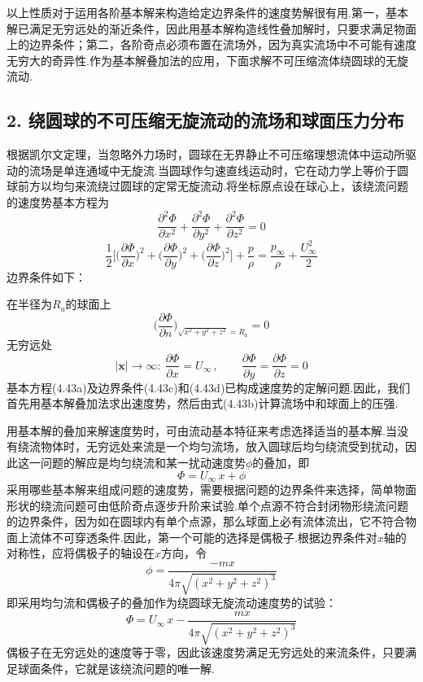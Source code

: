 以上性质对于运用各阶基本解来构造给定边界条件的速度势解很有用.第一，基本解已满足无穷远处的渐近条件，因此用基本解构造线性叠加解时，只要求满足物面上的边界条件；第二，各阶奇点必须布置在流场外，因为真实流场中不可能有速度无穷大的奇异性.作为基本解叠加法的应用，下面求解不可压缩流体绕圆球的无旋流动.

\subsection*{2. 绕圆球的不可压缩无旋流动的流场和球面压力分布}

根据凯尔文定理，当忽略外力场时，圆球在无界静止不可压缩理想流体中运动所驱动的流场是单连通域中无旋流.当圆球作匀速直线运动时，它在动力学上等价于圆球前方以均匀来流绕过圆球的定常无旋流动.将坐标原点设在球心上，该绕流问题的速度势基本方程为
\begin{equation*}
\frac{\partial^{2}\Phi}{\partial x^{2}}+\frac{\partial^{2}\Phi}{\partial y^{2}}+\frac{\partial^{2}\Phi}{\partial z^{2}}=0
\tag{4.43a}
\end{equation*}
\begin{equation*}
\frac{1}{2}\bigg[\Big(\frac{\partial\Phi}{\partial x}\Big)^{2}+\Big(\frac{\partial\Phi}{\partial y}\Big)^{2}+\Big(\frac{\partial\Phi}{\partial z}\Big)^{2}\bigg]+\frac{p}{\rho}=\frac{p_\infty}{\rho}+\frac{U_\infty^{2}}{2}
\tag{4.43b}
\end{equation*}
边界条件如下：

在半径为$R_a$的球面上
\begin{equation*}
\Big(\frac{\partial\Phi}{\partial n}\Big)_{\sqrt{x^{2}+y^{2}+z^{2}}=R_a}=0
\tag{4.43c}
\end{equation*}
无穷远处
\begin{equation*}
|\boldsymbol{x}|\to\infty:\ \frac{\partial\Phi}{\partial x}=U_\infty\,,\qquad \frac{\partial\Phi}{\partial y}=\frac{\partial\Phi}{\partial z}=0
\tag{4.43d}
\end{equation*}
基本方程(4.43a)及边界条件(4.43c)和(4.43d)已构成速度势的定解问题.因此，我们首先用基本解叠加法求出速度势，然后由式(4.43b)计算流场中和球面上的压强.

用基本解的叠加来解速度势时，可由流动基本特征来考虑选择适当的基本解.当没有绕流物体时，无穷远处来流是一个均匀流场，放入圆球后均匀绕流受到扰动，因此这一问题的解应是均匀绕流和某一扰动速度势$\phi$的叠加，即
\begin{equation*}
\Phi=U_\infty\,x+\phi
\tag{4.44}
\end{equation*}
采用哪些基本解来组成问题的速度势，需要根据问题的边界条件来选择，简单物面形状的绕流问题可由低阶奇点逐步升阶来试验.单个点源不符合封闭物形绕流问题的边界条件，因为如在圆球内有单个点源，那么球面上必有流体流出，它不符合物面上流体不可穿透条件.因此，第一个可能的选择是偶极子.根据边界条件对$x$轴的对称性，应将偶极子的轴设在$x$方向，令
\[
\phi=\frac{-mx}{4\pi\sqrt{(x^{2}+y^{2}+z^{2})^{3}}}
\]
即采用均匀流和偶极子的叠加作为绕圆球无旋流动速度势的试验：
\begin{equation*}
\Phi=U_\infty\,x-\frac{mx}{4\pi\sqrt{(x^{2}+y^{2}+z^{2})^{3}}}
\tag{4.45}
\end{equation*}
偶极子在无穷远处的速度等于零，因此该速度势满足无穷远处的来流条件，只要满足球面条件，它就是该绕流问题的唯一解.

